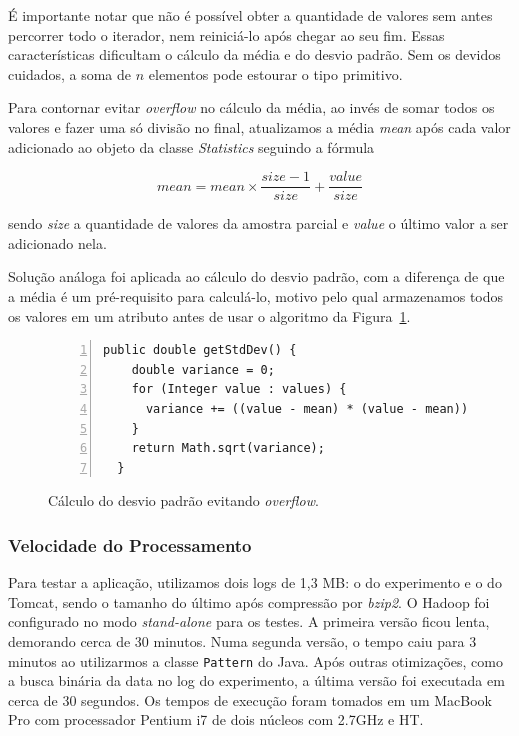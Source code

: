 \documentclass[brazil, a4paper,12pt]{article}
\begin{document}
É importante notar que não é possível obter a quantidade de valores sem antes
percorrer todo o iterador, nem reiniciá-lo após chegar ao seu fim. Essas
características dificultam o cálculo da média e do desvio padrão. Sem os
devidos cuidados, a soma de $n$ elementos pode estourar o tipo primitivo.

Para contornar evitar \emph{overflow} no cálculo da média, ao invés de somar
todos os valores e fazer uma só divisão no final, atualizamos a média
\emph{mean} após cada valor adicionado ao objeto da classe \emph{Statistics}
seguindo a fórmula

\[ mean = mean \times \frac{size-1}{size} + \frac{value}{size} \]

\noindent sendo \emph{size} a quantidade de valores da amostra parcial e
\emph{value} o último valor a ser adicionado nela.

Solução análoga foi aplicada ao cálculo do desvio padrão, com a diferença de
que a média é um pré-requisito para calculá-lo, motivo pelo qual armazenamos
todos os valores em um atributo antes de usar o algoritmo da
Figura~\ref{fig:stddev}.

\begin{figure} [!htb] \begin{center} \footnotesize
\begin{lstlisting}[numbers=left]
public double getStdDev() {
    double variance = 0;
    for (Integer value : values) {
      variance += ((value - mean) * (value - mean)) / (values.size() - 1);
    }
    return Math.sqrt(variance);
  }\end{lstlisting}
\end{center}
\caption{Cálculo do desvio padrão evitando \emph{overflow}.}
\label{fig:stddev}
\end{figure}

\subsubsection{Velocidade do Processamento}

Para testar a aplicação, utilizamos dois logs de 1,3 MB: o do experimento e o
do Tomcat, sendo o tamanho do último após compressão por \emph{bzip2}. O Hadoop
foi configurado no modo \emph{stand-alone} para os testes. A primeira versão
ficou lenta, demorando cerca de 30 minutos. Numa segunda versão, o tempo caiu
para 3 minutos ao utilizarmos a classe \verb|Pattern| do Java. Após outras
otimizações, como a busca binária da data no log do experimento, a última
versão foi executada em cerca de 30 segundos. Os tempos de execução foram
tomados em um MacBook Pro com processador Pentium i7 de dois núcleos com 2.7GHz
e HT.
\end{document}
